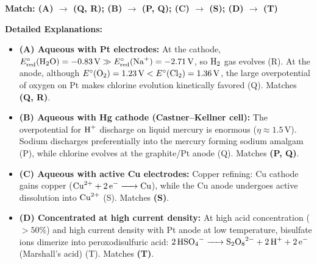 \begin{solution}
\textbf{Match: (A) $\to$ (Q, R); (B) $\to$ (P, Q); (C) $\to$ (S); (D) $\to$ (T)}

\textbf{Detailed Explanations:}
\begin{itemize}
    \item \textbf{(A) Aqueous  with Pt electrodes:} At the cathode, $E^\circ_{\text{red}}(\ce{H2O}) = -0.83\,\text{V} \gg E^\circ_{\text{red}}(\ce{Na+}) = -2.71\,\text{V}$, so $\ce{H2}$ gas evolves (R). At the anode, although $E^\circ(\ce{O2}) = 1.23\,\text{V} < E^\circ(\ce{Cl2}) = 1.36\,\text{V}$, the large overpotential of oxygen on Pt makes chlorine evolution kinetically favored (Q). Matches \textbf{(Q, R)}.
    \item \textbf{(B) Aqueous  with Hg cathode (Castner--Kellner cell):} The overpotential for $\ce{H+}$ discharge on liquid mercury is enormous ($\eta \approx 1.5\,\text{V}$). Sodium discharges preferentially into the mercury forming sodium amalgam  (P), while chlorine evolves at the graphite/Pt anode (Q). Matches \textbf{(P, Q)}.
    \item \textbf{(C) Aqueous  with active Cu electrodes:} Copper refining: Cu cathode gains copper ($\ce{Cu^2+ + 2e^- -> Cu}$), while the Cu anode undergoes active dissolution into $\ce{Cu^2+}$ (S). Matches \textbf{(S)}.
    \item \textbf{(D) Concentrated  at high current density:} At high acid concentration ($>50\%$) and high current density with Pt anode at low temperature, bisulfate ions dimerize into peroxodisulfuric acid: $\ce{2HSO4^- -> S2O8^2- + 2H+ + 2e^-}$ (Marshall's acid) (T). Matches \textbf{(T)}.
\end{itemize}
\end{solution}

